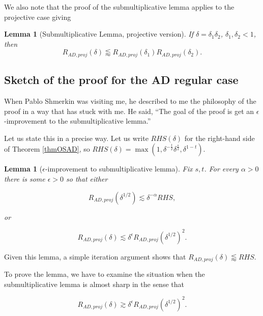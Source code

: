 \documentclass[12pt]{amsart}
\newtheorem{lemma}[theorem]{Lemma}
\begin{document}
We also note that the proof of the submultiplicative lemma applies to the projective case giving

\begin{lemma}[Submultiplicative Lemma, projective version]
    If $\delta = \delta_1 \delta_2$, $\delta_1, \delta_2 < 1$, then
    \[
        R_{AD, proj}(\delta) \lessapprox R_{AD, proj}(\delta_1) R_{AD, proj}(\delta_2).
    \]
\end{lemma}

\subsection{Sketch of the proof for the AD regular case}

When Pablo Shmerkin was visiting me,  he described to me the philosophy of the proof in a way that has stuck with me.   He said,  ``The goal of the proof is get an $\epsilon$-improvement to the submultiplicative lemma.''

Let us state this in a precise way.  Let us write $RHS(\delta)$ for the right-hand side of Theorem \ref{thmOSAD},  so $RHS(\delta) = \max \left( 1, \delta^{-\frac{t}{2}} \delta^{\frac{s}{2}}, \delta^{1 - t} \right).$

\begin{lemma} [$\epsilon$-improvement to submultiplicative lemma] Fix $s, t$.    For every $\alpha > 0$ there is some $\epsilon > 0$ so that either

$$ R_{AD, proj}(\delta^{1/2}) \lesssim \delta^{-\alpha} RHS, $$

or

$$ R_{AD, proj}(\delta) \lesssim \delta^\epsilon R_{AD, proj}(\delta^{1/2})^2. $$

\end{lemma}

Given this lemma,  a simple iteration argument shows that $R_{AD, proj}(\delta) \lessapprox RHS$.   

To prove the lemma,  we have to examine the situation when the submultiplicative lemma is almost sharp in the sense that

$$ R_{AD, proj}(\delta) \gtrsim \delta^\epsilon R_{AD, proj}(\delta^{1/2})^2. $$
\end{document}
